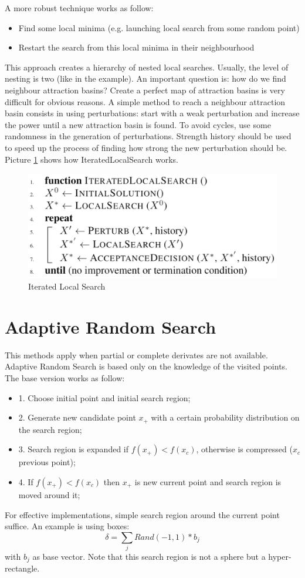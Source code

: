\documentclass[11pt]{article}
\begin{document}
A more robust technique works as follow:
\begin{itemize}
\item{Find some local minima (e.g. launching local search from some random point)}
\item{Restart the search from this local minima in their neighbourhood}
\end{itemize}
This approach creates a hierarchy of nested local searches. Usually, the level of nesting is two (like in the example). An important question is: how do we find neighbour attraction basins? Create a perfect map of attraction basins is very difficult for obvious reasons. A simple method to reach a neighbour attraction basin consists in using perturbations: start with a weak perturbation and increase the power until a new attraction basin is found. To avoid cycles, use some randomness in the generation of perturbations. Strength history should be used to speed up the process of finding how strong the new perturbation should be.
Picture \ref{fig:ils} shows how IteratedLocalSearch works.

\begin{figure}[H]
\includegraphics[scale=0.25]{ils}
\caption{Iterated Local Search}
\centering
\label{fig:ils}
\end{figure}

\section{Adaptive Random Search}
This methods apply when partial or complete derivates are not available. Adaptive Random Search is based only on the knowledge of the visited points. The base version works as follow:
\begin{itemize}
\item{1. Choose initial point and initial search region;}
\item{2. Generate new candidate point $x_+$ with a certain probability distribution on the search region;}
\item{3. Search region is expanded if $f(x_+) < f(x_c)$, otherwise is compressed ($x_c$ previous point);}
\item{4. If $f(x_+) < f(x_c)$ then $x_+$ is new current point and search region is moved around it;}
\end{itemize}
For effective implementations, simple search region around the current point suffice. An example is using boxes: 
$$
\delta = \sum_{j} Rand(-1,1) * b_j
$$
 with $b_j$ as base vector. Note that this search region is not a sphere but a hyper-rectangle.
\end{document}
